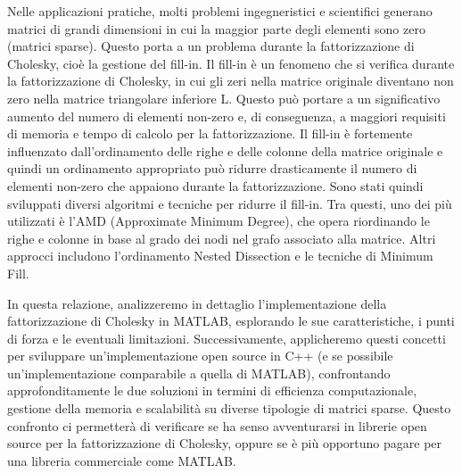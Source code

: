 Nelle applicazioni pratiche, molti problemi ingegneristici e scientifici generano matrici di grandi dimensioni in cui 
la maggior parte degli elementi sono zero (matrici sparse). Questo porta a un problema durante la fattorizzazione di Cholesky, 
cioè la gestione del fill-in.
Il fill-in è un fenomeno che si verifica durante la fattorizzazione di Cholesky, in cui gli zeri nella matrice originale
diventano non zero nella matrice triangolare inferiore L. Questo può portare a un significativo aumento del
numero di elementi non-zero e, di conseguenza, a maggiori requisiti di memoria e tempo di calcolo per la fattorizzazione.
Il fill-in è fortemente influenzato dall'ordinamento delle righe e delle colonne della matrice originale e quindi 
un ordinamento appropriato può ridurre drasticamente il numero di elementi non-zero che appaiono durante la fattorizzazione.
Sono stati quindi sviluppati diversi algoritmi e tecniche per ridurre il fill-in. Tra questi,
uno dei più utilizzati è l'AMD (Approximate Minimum Degree), che opera riordinando le righe e colonne in base al 
grado dei nodi nel grafo associato alla matrice. Altri approcci includono l'ordinamento Nested Dissection e le tecniche
di Minimum Fill.

In questa relazione, analizzeremo in dettaglio l'implementazione della fattorizzazione di Cholesky in MATLAB, esplorando 
le sue caratteristiche, i punti di forza e le eventuali limitazioni. Successivamente, applicheremo questi concetti per 
sviluppare un'implementazione open source in C++ (e se possibile un'implementazione comparabile a quella di MATLAB), 
confrontando approfonditamente le due soluzioni in termini di efficienza 
computazionale, gestione della memoria e scalabilità su diverse tipologie di matrici sparse. Questo confronto ci permetterà 
di verificare se ha senso avventurarsi in librerie open source per la fattorizzazione di Cholesky, oppure se è più
opportuno pagare per una libreria commerciale come MATLAB.
